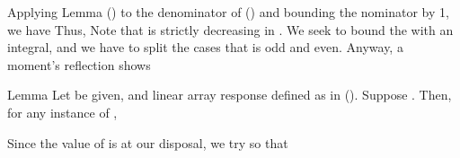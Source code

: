 Applying Lemma () to the denominator of () and bounding the nominator by 1, we have
Thus,
Note that  is strictly decreasing in .
We seek to bound the  with an integral, and we have to split the cases that  is odd and even.
Anyway, a moment's reflection shows



\Result
{Lemma}
{
Let \m {\f } be given, and linear array response  defined as in ().
Suppose .
Then, for any instance of \m {\f},
}

Since the value of  is at our disposal, we try
so that

\stopsubsection

\startsubsection [title={Norm of Angular Channel Response}]

